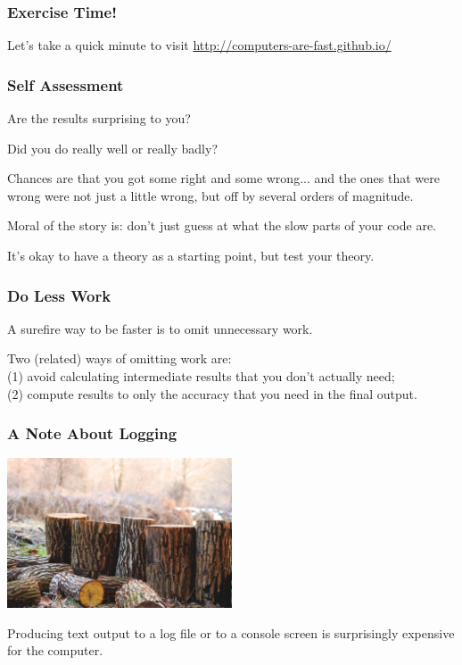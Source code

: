 \begin{frame}
\frametitle{Exercise Time!}

Let's take a quick minute to visit \url{http://computers-are-fast.github.io/} 

\end{frame}

\begin{frame}
\frametitle{Self Assessment}

Are the results surprising to you? 

Did you do really well or really badly? 

Chances are that you got some right and some wrong... and the ones that were wrong were not just a little wrong, but off by several orders of magnitude. 

Moral of the story is: don't just guess at what the slow parts of your code are. 

It's okay to have a theory as a starting point, but test your theory.

\end{frame}

\begin{frame}
\frametitle{Do Less Work}

A surefire way to be faster is to omit unnecessary
work. 

Two (related) ways of omitting work are:\\
\quad (1) avoid calculating intermediate results that you don't actually need;\\
\quad (2) compute results to only the accuracy that you need in the final output.


\end{frame}

\begin{frame}
\frametitle{A Note About Logging}

\begin{center}
	\includegraphics[width=0.5\textwidth]{images/logging.jpeg}
\end{center}

Producing text output to a log file or to a console screen is surprisingly expensive for the computer. 

\end{frame}

